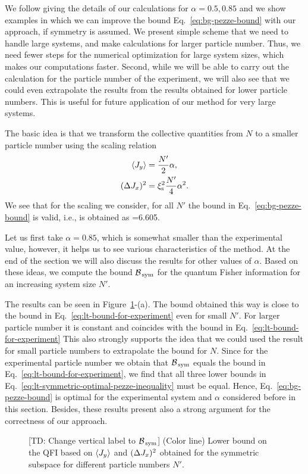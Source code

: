 We follow giving the details of our calculations for $\alpha=0.5,0.85$ and we show examples in which we can improve the bound Eq.~\eqref{eq:bg-pezze-bound} with our approach, if symmetry is assumed.
We present simple scheme that we need to handle large systems, and make calculations for larger particle number.
Thus, we need fewer steps for the numerical optimization for large system sizes, which makes our computations faster.
Second, while we will be able to carry out the calculation for the particle number of the experiment, we will also see that we could even extrapolate the results from the results obtained for lower particle numbers.
This is useful for future application of our method for very large systems.

The basic idea is that we transform the collective quantities from $N$ to a smaller particle number using the scaling relation
\begin{align}
  \langle{J_y}\rangle & = \frac{N'}{2}\alpha,\\
  (\Delta J_x )^2 & = \xi_{\textnormal{s}}^2 \frac{N'}{4}\alpha^2.
\end{align}
We see that for the scaling we consider, for all $N'$ the bound in Eq.~\eqref{eq:bg-pezze-bound} is valid, i.e., is obtained as
\be
  \geqslant {}=6.605.
\ee

Let us first take $\alpha=0.85$, which is somewhat smaller than the experimental value, however, it helps us to see various characteristics of the method.
At the end of the section we will also discuss the results for other values of $\alpha$.
Based on these ideas, we compute the bound $\mathcal{B}_{\, \textnormal{sym} }$ for the quantum Fisher information for an increasing system size $N'$.

The results can be seen in Figure~\ref{fig:lt-bounds-on-symmetric-spin-squeezing}-(a).
The bound obtained this way is close to the bound in Eq.~\eqref{eq:lt-bound-for-experiment} even for small $N'$.
For larger particle number it is constant and coincides with the bound in Eq.~\eqref{eq:lt-bound-for-experiment}
This also strongly supports the idea that we could used the result for small particle numbers to extrapolate the bound for $N$.
Since for the experimental particle number we obtain that $\mathcal{B}_{\, \text{sym} }$ equals the bound in Eq.~\eqref{eq:lt-bound-for-experiment}, we find that all three lower bounds in Eq.~\eqref{eq:lt-symmetric-optimal-pezze-inequality} must be equal.
Hence, Eq.~\eqref{eq:bg-pezze-bound} is optimal for the experimental system and $\alpha$ considered before in this section.
Besides, these results present also a strong argument for the correctness of our approach.
\begin{figure}[htp]
  \centering
  \caption[Asymptotic behavior of the bound for spin-squeezing experimental data]{
  [TD: Change vertical label to $\mathcal{B}_{\, \textnormal{sym} }$] (Color line) Lower bound on the QFI based on $\langle{J_y}\rangle$ and $(\Delta J_x )^2$ obtained for the symmetric subspace for different particle numbers $N'$.}
  \label{fig:lt-bounds-on-symmetric-spin-squeezing}
\end{figure}

